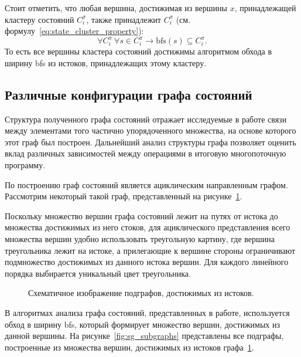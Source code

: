Стоит отметить, что любая вершина, достижимая из вершины $x$,
принадлежащей кластеру состояний $C_i^\pi$, также принадлежит
$C_i^\pi$ (см. формулу~\ref{eq:state_cluster_property}):
\begin{equation}
  \label{eq:state_cluster_property}
  \forall C_i^\pi\ \forall s \in C_i^\pi \rightarrow \text{bfs}(s)
  \subseteq C_i^\pi.
\end{equation}
То есть все вершины кластера состояний достижимы алгоритмом обхода в
ширину bfs из истоков, принадлежащих этому кластеру.

\subsection{Различные конфигурации графа состояний}
\label{sec:ch4/stategraph-configs}

Структура полученного графа состояний отражает исследуемые в работе
связи между элементами того частично упорядоченного множества, на
основе которого этот граф был построен. Дальнейший анализ структуры
графа позволяет оценить вклад различных зависимостей между операциями
в итоговую многопоточную программу.

По построению граф состояний является ациклическим направленным
графом. Рассмотрим некоторый такой граф, представленный на
рисунке~\ref{fig:general-sg-triangle}.

Поскольку множество вершин графа состояний лежит на путях от истока
до множества достижимых из него стоков, для ациклического
представления всего множества вершин удобно использовать треугольную
картину, где вершина треугольника лежит на истоке, а прилегающие к
вершине стороны ограничивают подмножество достижимых из данного
истока вершин. Для каждого линейного порядка выбирается уникальный
цвет треугольника.

\begin{figure}[htbp]
  \centering
  
  \caption{Схематичное изображение подграфов, достижимых из истоков.}
  \label{fig:general-sg-triangle}
\end{figure}

В алгоритмах анализа графа состояний, представленных в работе,
используется обход в ширину bfs, который формирует множество вершин,
достижимых из данной вершины. На рисунке~\ref{fig:sg_subgraphs}
представлены все подграфы, построенные из множества вершин,
достижимых из истоков графа~\ref{fig:general-sg-triangle}.

